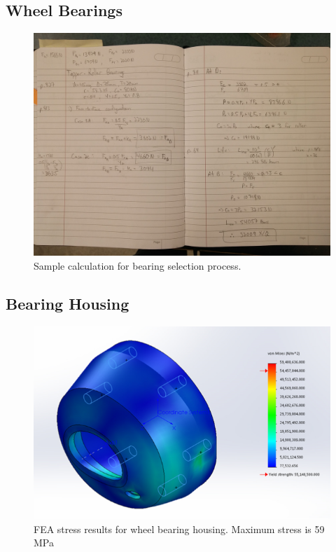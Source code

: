 \subsection{Wheel Bearings}\label{sec:ws_bearing}

\begin{figure}[H]
	\centering
	\includegraphics[width=\textwidth]{dom/bearing_selection_calc.jpg}
	\caption{Sample calculation for bearing selection process.}
	\label{fig:bearing_calc}
\end{figure}

\subsection{Bearing Housing}\label{sec:bh_fea}

\begin{figure}[H]
\centering
\includegraphics[width=\textwidth]{images/wheel_hub_fea}
\caption[Wheel Bearing Housing FEA Stress Results]{FEA stress results for wheel bearing housing. Maximum stress is 59 MPa}
\label{fig:wheel_hub_stress_fea}
\end{figure}


